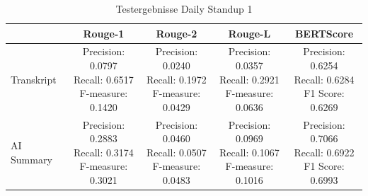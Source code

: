 \begin{table}[H]
    \centering
    \begin{tabular}{|p{2cm}|c|c|c|c|}
    \hline
     & \textbf{Rouge-1} & \textbf{Rouge-2} & \textbf{Rouge-L} &\textbf{BERTScore}\\ \hline
    \hline
    Transkript & \makecell[l]{Precision: 0.0797\\ Recall: 0.6517\\ F-measure: 0.1420} & \makecell[l]{Precision: 0.0240\\ Recall: 0.1972\\ F-measure: 0.0429} & \makecell[l]{Precision: 0.0357\\ Recall: 0.2921\\ F-measure: 0.0636} &\makecell[l]{Precision: 0.6254\\ Recall: 0.6284\\ F1 Score: 0.6269} \\
    \hline
    AI Summary & \makecell[l]{Precision: 0.2883\\ Recall: 0.3174\\ F-measure: 0.3021} & \makecell[l]{Precision: 0.0460\\ Recall: 0.0507\\ F-measure: 0.0483} & \makecell[l]{Precision: 0.0969\\ Recall: 0.1067\\ F-measure: 0.1016} &\makecell[l]{Precision: 0.7066\\ Recall: 0.6922\\ F1 Score: 0.6993} \\
    \hline
    \end{tabular}
    \caption{Testergebnisse Daily Standup 1}
    \label{tab:test2}
\end{table}

